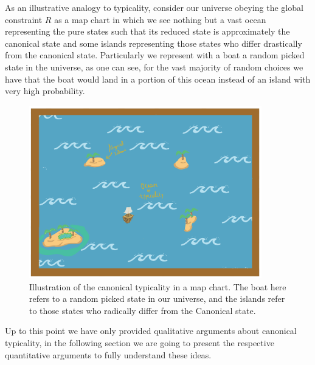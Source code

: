 \indent As an illustrative analogy to typicality, consider our universe obeying the global constraint $R$ as a map chart in which we see nothing but a vast ocean representing the pure states such that its reduced state is approximately the canonical state and some islands representing those states who differ drastically from the canonical state. Particularly we represent with a boat a random picked state in the universe, as one can see, for the vast majority of random choices we have that the boat would land in a portion of this ocean instead of an island with very high probability.\\


\begin{figure}[h!]
\centering
\includegraphics[width=0.9\textwidth]{Figures/ocean-of-typicality.png}
\caption{Illustration of the canonical typicality in a map chart. The boat here refers to a random picked state in our universe, and the islands refer to those states who radically differ from the Canonical state.}
\end{figure}
Up to this point we have only provided qualitative arguments about canonical typicality, in the following section we are going to present the respective quantitative arguments to fully understand these ideas.

